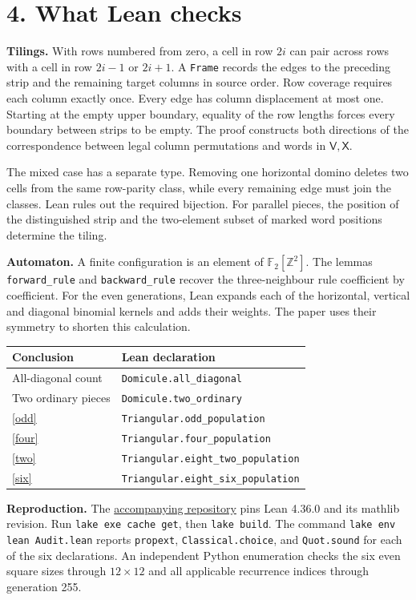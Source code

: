 \documentclass[12pt,a4paper]{article}
\newcommand{\stmt}[1]{\textbf{\color{accent}#1}\enspace}
\newcommand{\V}{\mathsf V}\newcommand{\X}{\mathsf X}
\newcommand{\repo}{https://github.com/dreamzzz-dev/oeis-combinatorial-proofs}
\begin{document}
\newpage
\section*{4. What Lean checks}
\stmt{Tilings.} With rows numbered from zero, a cell in row $2i$ can pair across rows with a cell in row $2i-1$ or $2i+1$. A \texttt{Frame} records the edges to the preceding strip and the remaining target columns in source order. Row coverage requires each column exactly once. Every edge has column displacement at most one. Starting at the empty upper boundary, equality of the row lengths forces every boundary between strips to be empty. The proof constructs both directions of the correspondence between legal column permutations and words in $\V,\X$.

The mixed case has a separate type. Removing one horizontal domino deletes two cells from the same row-parity class, while every remaining edge must join the classes. Lean rules out the required bijection. For parallel pieces, the position of the distinguished strip and the two-element subset of marked word positions determine the tiling.

\stmt{Automaton.} A finite configuration is an element of $\mathbb F_2[\mathbb Z^2]$. The lemmas \texttt{forward\_rule} and \texttt{backward\_rule} recover the three-neighbour rule coefficient by coefficient. For the even generations, Lean expands each of the horizontal, vertical and diagonal binomial kernels and adds their weights. The paper uses their symmetry to shorten this calculation.

\begin{center}\small
\begin{tabularx}{\linewidth}{@{}lX@{}}\toprule
Conclusion & Lean declaration\\\midrule
All-diagonal count & \texttt{Domicule.all\_diagonal}\\
Two ordinary pieces & \texttt{Domicule.two\_ordinary}\\
\eqref{odd} & \texttt{Triangular.odd\_population}\\
\eqref{four} & \texttt{Triangular.four\_population}\\
\eqref{two} & \texttt{Triangular.eight\_two\_population}\\
\eqref{six} & \texttt{Triangular.eight\_six\_population}\\\bottomrule
\end{tabularx}
\end{center}

\stmt{Reproduction.} The \href{\repo}{accompanying repository} pins Lean 4.36.0 and its mathlib revision. Run \texttt{lake exe cache get}, then \texttt{lake build}. The command \texttt{lake env lean Audit.lean} reports \texttt{propext}, \texttt{Classical.choice}, and \texttt{Quot.sound} for each of the six declarations. An independent Python enumeration checks the six even square sizes through $12\times12$ and all applicable recurrence indices through generation 255.
\end{document}
